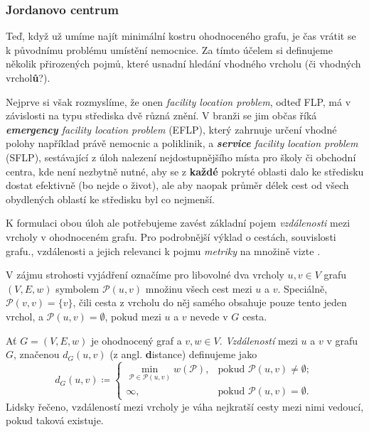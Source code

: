 \subsubsection{Jordanovo centrum}
\label{sssec:jordanovo-centrum}

Teď, když už umíme najít minimální kostru ohodnoceného grafu, je čas vrátit se
k původnímu problému umístění nemocnice. Za tímto účelem si definujeme několik
přirozených pojmů, které usnadní hledání vhodného vrcholu (či vhodných
vrchol\textbf{ů}?).

Nejprve si však rozmyslíme, že onen \emph{facility location problem}, odteď
FLP, má v závislosti na typu střediska dvě různá znění. V branži se jim občas
říká \emph{\textbf{emergency} facility location problem} (EFLP), který zahrnuje
určení vhodné polohy například právě nemocnic a poliklinik, a
\emph{\textbf{service} facility location problem} (SFLP), sestávající z úloh
nalezení nejdostupnějšího místa pro školy či obchodní centra, kde není nezbytně
nutné, aby se z \textbf{každé} pokryté oblasti dalo ke středisku dostat
efektivně (bo nejde o život), ale aby naopak průměr délek cest od všech
obydlených oblastí ke středisku byl co nejmenší.

K formulaci obou úloh ale potřebujeme zavést základní pojem \emph{vzdálenosti}
mezi vrcholy v ohodnoceném grafu. Pro podrobnější výklad o cestách, souvislosti
grafu., vzdálenosti a jejich relevanci k pojmu \emph{metriky} na množině vizte
.

V zájmu strohosti vyjádření označíme pro libovolné dva vrcholy $u,v \in V$
grafu $(V,E,w)$ symbolem $\mathcal{P}(u,v)$ množinu všech cest mezi $u$ a $v$.
Speciálně, $\mathcal{P}(v,v) = \{v\}$, čili cesta z vrcholu do něj samého
obsahuje pouze tento jeden vrchol, a $\mathcal{P}(u,v) = \emptyset$, pokud mezi
$u$ a $v$ nevede v $G$ cesta.

\begin{definition}
\label{def:vzdalenost-v-grafu}
 Ať $G = (V,E,w)$ je ohodnocený graf a $v,w \in V$. \emph{Vzdáleností} mezi $u$
 a $v$ v grafu $G$, značenou $d_G(u,v)$ (z angl. \textbf{d}istance) definujeme
 jako
 \[
  d_G(u,v) \coloneqq 
  \begin{cases}
   \min_{\mathcal{P} \in \mathcal{P}(u,v)} w(\mathcal{P}),& \text{pokud }
   \mathcal{P}(u,v) \neq \emptyset;\\
   \infty, &\text{pokud } \mathcal{P}(u,v) = \emptyset.
  \end{cases}
 \]
 Lidsky řečeno, vzdáleností mezi vrcholy je váha nejkratší cesty mezi nimi
 vedoucí, pokud taková existuje.
\end{definition}

